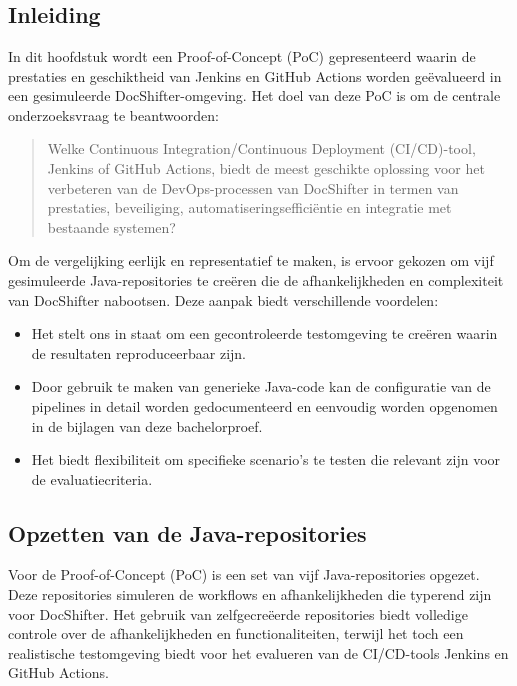\chapter{}%
\label{ch:Proof-Of-Concept}

\section{Inleiding}

In dit hoofdstuk wordt een Proof-of-Concept (PoC) gepresenteerd waarin de prestaties en geschiktheid van Jenkins en GitHub Actions worden geëvalueerd in een gesimuleerde DocShifter-omgeving. Het doel van deze PoC is om de centrale onderzoeksvraag te beantwoorden:

\begin{quote}
    Welke Continuous Integration/Continuous Deployment (CI/CD)-tool, Jenkins of GitHub Actions, biedt de meest geschikte oplossing voor het verbeteren van de DevOps-processen van DocShifter in termen van prestaties, beveiliging, automatiseringsefficiëntie en integratie met bestaande systemen?
\end{quote}

Om de vergelijking eerlijk en representatief te maken, is ervoor gekozen om vijf gesimuleerde Java-repositories te creëren die de afhankelijkheden en complexiteit van DocShifter nabootsen. Deze aanpak biedt verschillende voordelen:
\begin{itemize}
    \item Het stelt ons in staat om een gecontroleerde testomgeving te creëren waarin de resultaten reproduceerbaar zijn.
    \item Door gebruik te maken van generieke Java-code kan de configuratie van de pipelines in detail worden gedocumenteerd en eenvoudig worden opgenomen in de bijlagen van deze bachelorproef.
    \item Het biedt flexibiliteit om specifieke scenario's te testen die relevant zijn voor de evaluatiecriteria.
\end{itemize}

\section{Opzetten van de Java-repositories}

Voor de Proof-of-Concept (PoC) is een set van vijf Java-repositories opgezet. Deze repositories simuleren de workflows en afhankelijkheden die typerend zijn voor DocShifter. Het gebruik van zelfgecreëerde repositories biedt volledige controle over de afhankelijkheden en functionaliteiten, terwijl het toch een realistische testomgeving biedt voor het evalueren van de CI/CD-tools Jenkins en GitHub Actions.

